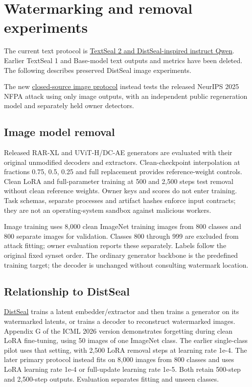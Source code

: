 \section{Watermarking and removal
experiments}\label{record-docs-watermarking-md-watermarking-and-removal-experiments}

The current text protocol is
\href{records/docs/instruct_watermarking.tex}{TextSeal 2 and
DistSeal-inspired instruct Qwen}. Earlier TextSeal 1 and Base-model text
outputs and metrics have been deleted. The following describes preserved
DistSeal image experiments.

The new \href{records/docs/closed_image_watermarking.tex}{closed-source
image protocol} instead tests the released NeurIPS 2025 NFPA attack
using only image outputs, with an independent public regeneration model
and separately held owner detectors.

\subsection{Image model
removal}\label{record-docs-watermarking-md-image-model-removal}

Released RAR-XL and UViT-H/DC-AE generators are evaluated with their
original unmodified decoders and extractors. Clean-checkpoint
interpolation at fractions 0.75, 0.5, 0.25 and full replacement provides
reference-weight controls. Clean LoRA and full-parameter training at 500
and 2,500 steps test removal without clean reference weights. Owner keys
and scores do not enter training. Task schemas, separate processes and
artifact hashes enforce input contracts; they are not an
operating-system sandbox against malicious workers.

Image training uses 8,000 clean ImageNet training images from 800
classes and 800 separate images for validation. Classes 800 through 999
are excluded from attack fitting; owner evaluation reports these
separately. Labels follow the original fixed synset order. The ordinary
generator backbone is the predefined training target; the decoder is
unchanged without consulting watermark location.

\subsection{Relationship to
DistSeal}\label{record-docs-watermarking-md-relationship-to-distseal}

\href{https://proceedings.mlr.press/v306/rebuffi26a.html}{DistSeal}
trains a latent embedder/extractor and then trains a generator on its
watermarked latents, or trains a decoder to reconstruct watermarked
images. Appendix G of the ICML 2026 version demonstrates forgetting
during clean LoRA fine-tuning, using 50 images of one ImageNet class.
The earlier single-class pilot uses that setting, with 2,500 LoRA
removal steps at learning rate 1e-4. The later primary protocol instead
fits on 8,000 images from 800 classes and uses LoRA learning rate 1e-4
or full-update learning rate 1e-5. Both retain 500-step and 2,500-step
outputs. Evaluation separates fitting and unseen classes.

